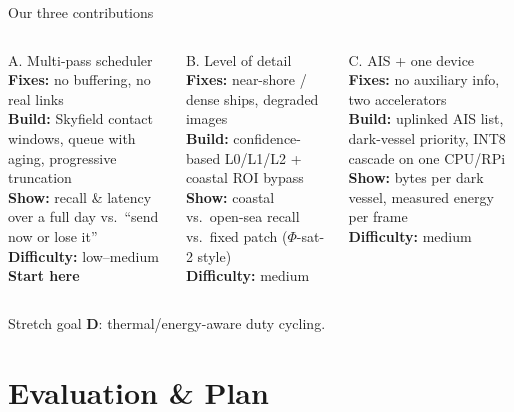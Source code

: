 \documentclass[aspectratio=169,10pt]{beamer}
\newcommand{\phisat}[1]{$\Phi$-sat-#1}
\begin{document}
\begin{frame}{Our three contributions}
\begin{columns}[T]
\begin{block}{A. Multi-pass scheduler}
\scriptsize
\textbf{Fixes:} no buffering, no real links\\[1mm]
\textbf{Build:} Skyfield contact windows, queue with aging, progressive truncation\\[1mm]
\textbf{Show:} recall \& latency over a full day vs.\ ``send now or lose it''\\[1mm]
\textbf{Difficulty:} low--medium\\
\textcolor{accent}{\textbf{Start here}}
\end{block}
\begin{block}{B. Level of detail}
\scriptsize
\textbf{Fixes:} near-shore / dense ships, degraded images\\[1mm]
\textbf{Build:} confidence-based L0/L1/L2 + coastal ROI bypass\\[1mm]
\textbf{Show:} coastal vs.\ open-sea recall vs.\ fixed patch (\phisat{2} style)\\[1mm]
\textbf{Difficulty:} medium
\end{block}
\begin{block}{C. AIS + one device}
\scriptsize
\textbf{Fixes:} no auxiliary info, two accelerators\\[1mm]
\textbf{Build:} uplinked AIS list, dark-vessel priority, INT8 cascade on one CPU/RPi\\[1mm]
\textbf{Show:} bytes per dark vessel, measured energy per frame\\[1mm]
\textbf{Difficulty:} medium
\end{block}
\end{columns}
\vspace{2mm}
\centering\small Stretch goal \textbf{D}: thermal/energy-aware duty cycling.
\end{frame}

\section{Evaluation \& Plan}
\end{document}
